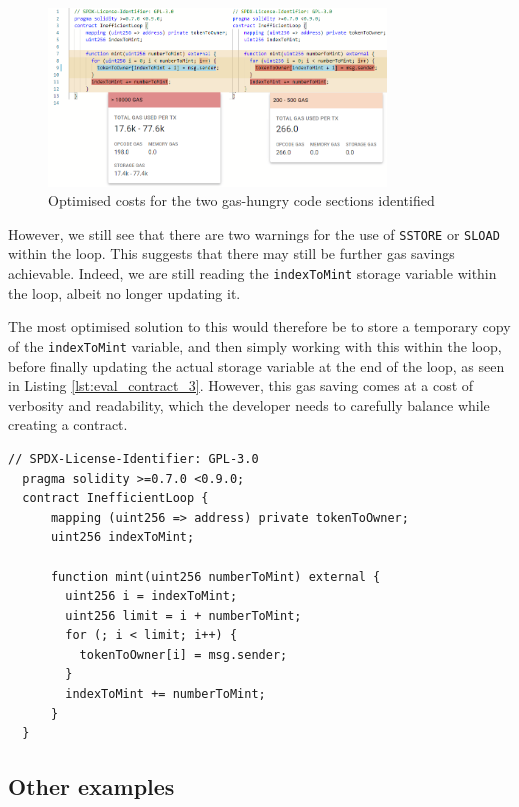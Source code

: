 \begin{figure}[h]
  \centering
  \includegraphics[width=0.8\textwidth]{./figures/eval/case_gas_better}
  \caption{Optimised costs for the two gas-hungry code sections identified}
  \label{fig:eval_case_gas_better}
\end{figure}

However, we still see that there are two warnings for the use of \texttt{SSTORE} or \texttt{SLOAD} 
within the loop. This suggests that there may still be further gas savings achievable. Indeed,
we are still reading the \texttt{indexToMint} storage variable within the loop, albeit
no longer updating it. 

The most optimised solution to this would therefore be to store a temporary copy
of the \texttt{indexToMint} variable, and then simply working with this within the loop, before 
finally updating the actual storage variable at the end of the loop, as seen in Listing 
\ref{lst:eval_contract_3}. However, this gas saving comes at a cost of verbosity and
readability, which the developer needs to carefully balance while creating a contract.

\begin{lstlisting}[language=Solidity, caption={The most optimised loop contract}, label={lst:eval_contract_3}, basicstyle=\ttfamily\scriptsize]
  // SPDX-License-Identifier: GPL-3.0
  pragma solidity >=0.7.0 <0.9.0;
  contract InefficientLoop {
      mapping (uint256 => address) private tokenToOwner;
      uint256 indexToMint;

      function mint(uint256 numberToMint) external {
        uint256 i = indexToMint;
        uint256 limit = i + numberToMint;
        for (; i < limit; i++) {
          tokenToOwner[i] = msg.sender;
        }
        indexToMint += numberToMint;
      }
  }
\end{lstlisting}

\subsection{Other examples}

